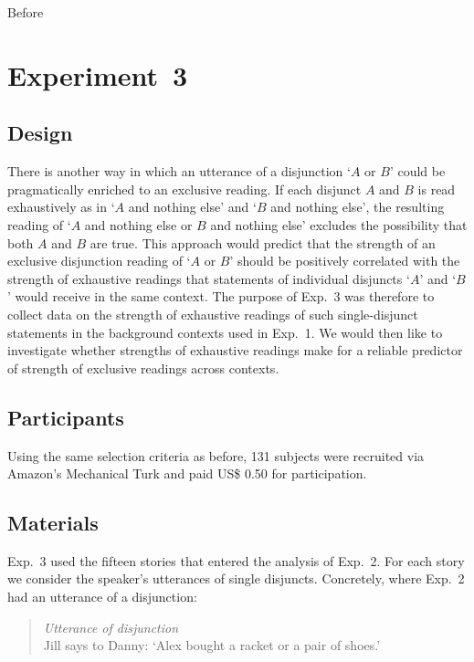 \documentclass[12pt]{article}
\begin{document}
Before 




\section{Experiment~3}

\subsection{Design}

There is another way in which an utterance of a disjunction `$A$ or $B$' could be pragmatically
enriched to an exclusive reading. If each disjunct $A$ and $B$ is read exhaustively as in `$A$
and nothing else' and `$B$ and nothing else', the resulting reading of `$A$ and nothing else or
$B$ and nothing else' excludes the possibility that both $A$ and $B$ are true.  This approach would predict that the strength of an
exclusive disjunction reading of `$A$ or $B$' should be positively correlated with the strength
of exhaustive readings that statements of individual disjuncts `$A$' and `$B$' would receive in
the same context. The purpose of Exp.~3 was therefore to collect data on the strength of
exhaustive readings of such single-disjunct statements in the background contexts used in
Exp.~1. We would then like to investigate whether strengths of exhaustive readings make for a
reliable predictor of strength of exclusive readings across contexts.

\subsection{Participants}

Using the same selection criteria as before, 131 subjects were recruited via Amazon's
Mechanical Turk and paid US\$ 0.50 for participation.

\subsection{Materials}

Exp.~3 used the fifteen stories that entered the analysis of Exp.~2. For each story we consider
the speaker's utterances of single disjuncts. Concretely, where Exp.~2 had an utterance of a
disjunction:

\begin{quote}
  \emph{Utterance of disjunction}\\
  Jill says to Danny: `Alex bought a racket or a pair of shoes.'
\end{quote}
\end{document}
